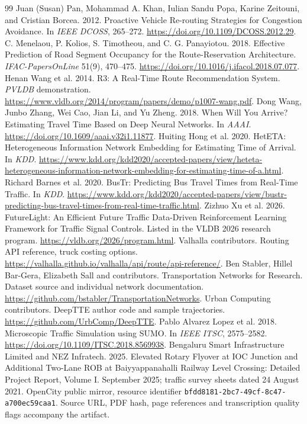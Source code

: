 \documentclass[sigconf,anonymous,review]{acmart}
\begin{document}
\begin{thebibliography}{99}
 Juan (Susan) Pan, Mohammad A. Khan, Iulian Sandu Popa, Karine Zeitouni, and Cristian Borcea. 2012. Proactive Vehicle Re-routing Strategies for Congestion Avoidance. In \emph{IEEE DCOSS}, 265--272. \url{https://doi.org/10.1109/DCOSS.2012.29}.
 C. Menelaou, P. Kolios, S. Timotheou, and C. G. Panayiotou. 2018. Effective Prediction of Road Segment Occupancy for the Route-Reservation Architecture. \emph{IFAC-PapersOnLine} 51(9), 470--475. \url{https://doi.org/10.1016/j.ifacol.2018.07.077}.
 Henan Wang et al. 2014. R3: A Real-Time Route Recommendation System. \emph{PVLDB} demonstration. \url{https://www.vldb.org/2014/program/papers/demo/p1007-wang.pdf}.
 Dong Wang, Junbo Zhang, Wei Cao, Jian Li, and Yu Zheng. 2018. When Will You Arrive? Estimating Travel Time Based on Deep Neural Networks. In \emph{AAAI}. \url{https://doi.org/10.1609/aaai.v32i1.11877}.
 Huiting Hong et al. 2020. HetETA: Heterogeneous Information Network Embedding for Estimating Time of Arrival. In \emph{KDD}. \url{https://www.kdd.org/kdd2020/accepted-papers/view/heteta-heterogeneous-information-network-embedding-for-estimating-time-of-a.html}.
 Richard Barnes et al. 2020. BusTr: Predicting Bus Travel Times from Real-Time Traffic. In \emph{KDD}. \url{https://www.kdd.org/kdd2020/accepted-papers/view/bustr-predicting-bus-travel-times-from-real-time-traffic.html}.
 Zizhuo Xu et al. 2026. FutureLight: An Efficient Future Traffic Data-Driven Reinforcement Learning Framework for Traffic Signal Controls. Listed in the VLDB 2026 research program. \url{https://vldb.org/2026/program.html}.
 Valhalla contributors. Routing API reference, truck costing options. \url{https://valhalla.github.io/valhalla/api/route/api-reference/}.
 Ben Stabler, Hillel Bar-Gera, Elizabeth Sall and contributors. Transportation Networks for Research. Dataset source and individual network documentation. \url{https://github.com/bstabler/TransportationNetworks}.
 Urban Computing contributors. DeepTTE author code and sample trajectories. \url{https://github.com/UrbComp/DeepTTE}.
 Pablo Alvarez Lopez et al. 2018. Microscopic Traffic Simulation using SUMO. In \emph{IEEE ITSC}, 2575--2582. \url{https://doi.org/10.1109/ITSC.2018.8569938}.
 Bengaluru Smart Infrastructure Limited and NEZ Infratech. 2025. Elevated Rotary Flyover at IOC Junction and Additional Two-Lane ROB at Baiyyappanahalli Railway Level Crossing: Detailed Project Report, Volume I. September 2025; traffic survey sheets dated 24 August 2021. OpenCity public mirror, resource identifier \texttt{bfdd8181-2bc7-49cf-8c47-a700ec59caa1}. Source URL, PDF hash, page references and transcription quality flags accompany the artifact.
\end{thebibliography}
\end{document}

